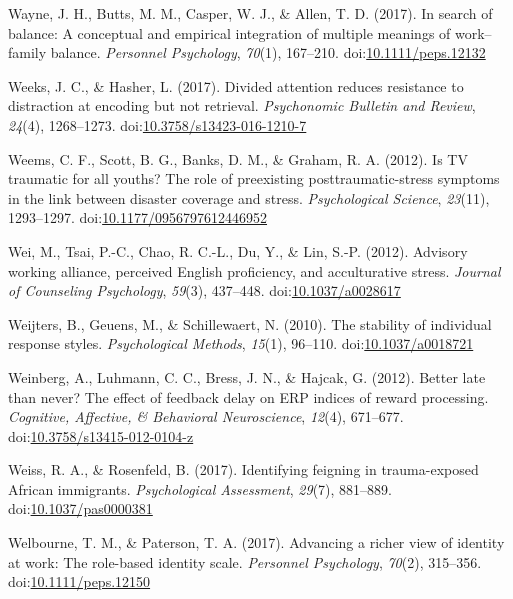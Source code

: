 \documentclass[english,man]{apa6}
\theoremstyle{definition}
\theoremstyle{definition}
\theoremstyle{definition}
\theoremstyle{remark}
\begin{document}
\hypertarget{ref-Wayne2017}{}
Wayne, J. H., Butts, M. M., Casper, W. J., \& Allen, T. D. (2017). In
search of balance: A conceptual and empirical integration of multiple
meanings of work--family balance. \emph{Personnel Psychology},
\emph{70}(1), 167--210.
doi:\href{https://doi.org/10.1111/peps.12132}{10.1111/peps.12132}

\hypertarget{ref-Weeks2016}{}
Weeks, J. C., \& Hasher, L. (2017). Divided attention reduces resistance
to distraction at encoding but not retrieval. \emph{Psychonomic Bulletin
and Review}, \emph{24}(4), 1268--1273.
doi:\href{https://doi.org/10.3758/s13423-016-1210-7}{10.3758/s13423-016-1210-7}

\hypertarget{ref-Weems2012}{}
Weems, C. F., Scott, B. G., Banks, D. M., \& Graham, R. A. (2012). Is TV
traumatic for all youths? The role of preexisting posttraumatic-stress
symptoms in the link between disaster coverage and stress.
\emph{Psychological Science}, \emph{23}(11), 1293--1297.
doi:\href{https://doi.org/10.1177/0956797612446952}{10.1177/0956797612446952}

\hypertarget{ref-Wei2012}{}
Wei, M., Tsai, P.-C., Chao, R. C.-L., Du, Y., \& Lin, S.-P. (2012).
Advisory working alliance, perceived English proficiency, and
acculturative stress. \emph{Journal of Counseling Psychology},
\emph{59}(3), 437--448.
doi:\href{https://doi.org/10.1037/a0028617}{10.1037/a0028617}

\hypertarget{ref-Weijters2010}{}
Weijters, B., Geuens, M., \& Schillewaert, N. (2010). The stability of
individual response styles. \emph{Psychological Methods}, \emph{15}(1),
96--110. doi:\href{https://doi.org/10.1037/a0018721}{10.1037/a0018721}

\hypertarget{ref-Weinberg2012}{}
Weinberg, A., Luhmann, C. C., Bress, J. N., \& Hajcak, G. (2012). Better
late than never? The effect of feedback delay on ERP indices of reward
processing. \emph{Cognitive, Affective, \& Behavioral Neuroscience},
\emph{12}(4), 671--677.
doi:\href{https://doi.org/10.3758/s13415-012-0104-z}{10.3758/s13415-012-0104-z}

\hypertarget{ref-Weiss2017}{}
Weiss, R. A., \& Rosenfeld, B. (2017). Identifying feigning in
trauma-exposed African immigrants. \emph{Psychological Assessment},
\emph{29}(7), 881--889.
doi:\href{https://doi.org/10.1037/pas0000381}{10.1037/pas0000381}

\hypertarget{ref-Welbourne2017}{}
Welbourne, T. M., \& Paterson, T. A. (2017). Advancing a richer view of
identity at work: The role-based identity scale. \emph{Personnel
Psychology}, \emph{70}(2), 315--356.
doi:\href{https://doi.org/10.1111/peps.12150}{10.1111/peps.12150}
\end{document}
